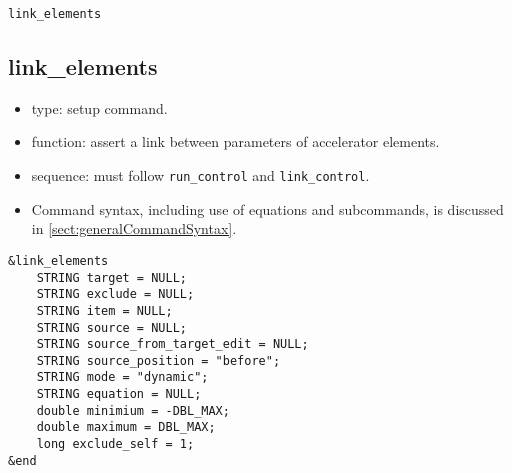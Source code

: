 \documentclass[11pt]{article}
\begin{document}
\newpage
\begin{center}{\Large\verb|link_elements|}\end{center}
\subsection{link\_elements \label{subsec:linkelements}}

\begin{itemize}
\item type: setup command.
\item function: assert a link between parameters of accelerator elements.
\item sequence: must follow \verb|run_control| and \verb|link_control|.
\item Command syntax, including use of equations and subcommands, is discussed in \ref{sect:generalCommandSyntax}.
\end{itemize}

\begin{verbatim}
&link_elements
    STRING target = NULL;
    STRING exclude = NULL;
    STRING item = NULL;
    STRING source = NULL;
    STRING source_from_target_edit = NULL;
    STRING source_position = "before";
    STRING mode = "dynamic";
    STRING equation = NULL;
    double minimium = -DBL_MAX;
    double maximum = DBL_MAX;
    long exclude_self = 1;
&end
\end{verbatim}
\end{document}
